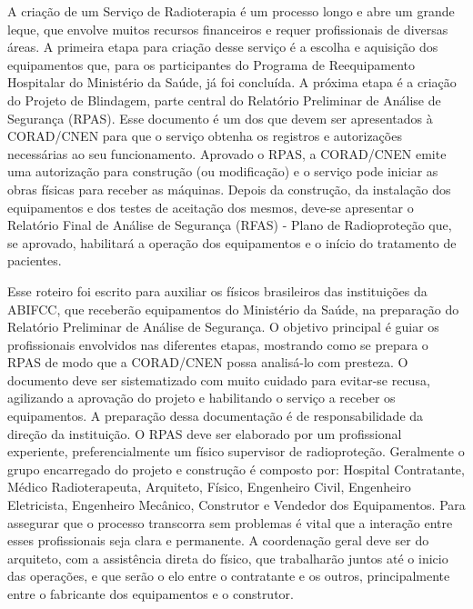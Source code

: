 \documentclass[
	12pt,				%
    oneside,			%
	a4paper,			%
	english,			%
	french,				%
	spanish,			%
	brazil,				%
	]{abntex2}
\begin{document}
A criação de um Serviço de Radioterapia é um processo longo e abre um grande leque, que envolve muitos recursos financeiros e requer profissionais de diversas áreas. A primeira etapa para criação desse serviço é a escolha e aquisição dos equipamentos que, para os participantes do Programa de Reequipamento Hospitalar do Ministério da Saúde, já foi concluída. A próxima etapa é a criação do Projeto de Blindagem, parte central do Relatório Preliminar de Análise de Segurança (RPAS). Esse documento é um dos que devem ser apresentados à CORAD/CNEN para que o serviço obtenha os registros e autorizações necessárias ao seu funcionamento. Aprovado o RPAS, a CORAD/CNEN emite uma autorização para construção (ou modificação) e o serviço pode iniciar as obras físicas para receber as máquinas. Depois da construção, da instalação dos equipamentos e dos testes de aceitação dos mesmos, deve-se apresentar o Relatório Final de Análise de Segurança (RFAS) - Plano de Radioproteção que, se aprovado, habilitará a operação dos equipamentos e o início do tratamento de pacientes. 

Esse roteiro foi escrito para auxiliar os físicos brasileiros das instituições da ABIFCC, que receberão equipamentos do Ministério da Saúde, na preparação do Relatório Preliminar de Análise de Segurança. O objetivo principal é guiar os profissionais envolvidos nas diferentes etapas, mostrando como se prepara o RPAS de modo que a CORAD/CNEN possa analisá-lo com presteza. O documento deve ser sistematizado com muito cuidado para evitar-se recusa, agilizando a aprovação do projeto e habilitando o serviço a receber os equipamentos. A preparação dessa documentação é de responsabilidade da direção da instituição. O RPAS deve ser elaborado por um profissional experiente, preferencialmente um físico supervisor de radioproteção. Geralmente o grupo encarregado do projeto e construção é composto por: Hospital Contratante, Médico Radioterapeuta, Arquiteto, Físico, Engenheiro Civil, Engenheiro Eletricista, Engenheiro Mecânico, Construtor e Vendedor dos Equipamentos. Para assegurar que o processo transcorra sem problemas é vital que a interação entre esses profissionais seja clara e permanente. A coordenação geral deve ser do arquiteto, com a assistência direta do físico, que trabalharão juntos até o inicio das operações, e que serão o elo entre o contratante e os outros, principalmente entre o fabricante dos equipamentos e o construtor. 
\end{document}
